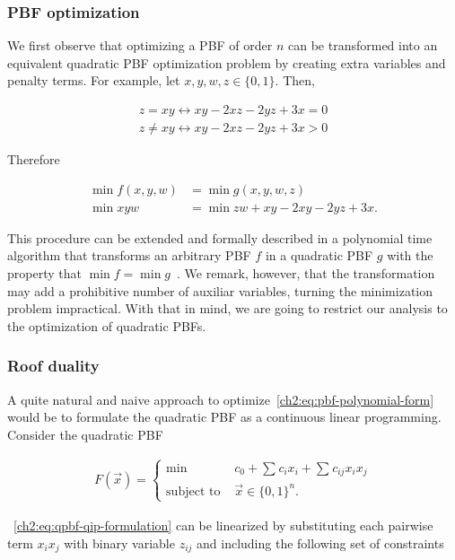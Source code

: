 \subsubsection{PBF optimization}
 We first observe that optimizing a PBF of order $n$ can be transformed into an equivalent quadratic PBF optimization problem by creating extra variables and penalty terms. For example, let $x,y,w,z \in \{0,1\}$. Then,
 
 \begin{align*}
 	z=xy \leftrightarrow  xy -2xz-2yz+3x=0 \\
 	z \neq xy \leftrightarrow  xy -2xz-2yz+3x>0
 \end{align*}
 
 Therefore
 
\begin{align*}
	\min f(x,y,w) &= \min g(x,y,w,z) \\
    \min xyw &= \min zw + xy -2xy -2yz +3x .
\end{align*} 

  This procedure can be extended and formally described in a polynomial time algorithm that transforms an arbitrary PBF $f$ in a quadratic PBF $g$ with the property that $\min f = \min g$~\cite{boros02pseudo}. We remark, however, that the transformation may add a prohibitive number of auxiliar variables, turning the minimization problem impractical. With that in mind, we are going to restrict our analysis to the optimization of quadratic PBFs.
  
\subsubsection{Roof duality}

A quite natural and naive approach to optimize~\cref{ch2:eq:pbf-polynomial-form} would be to formulate the quadratic PBF as a continuous linear programming. Consider the quadratic PBF

\begin{align}
	F(\vec{x}) = \left\{ \begin{array}{rl}
		\min &c_0 + \sum_{}{c_ix_i} + \sum_{}{c_{ij}x_ix_j} \\
	\text{subject to }& \vec{x} \in \{0,1\}^n.
	\end{array}\right.
	\label{ch2:eq:qpbf-qip-formulation}
\end{align}

~\cref{ch2:eq:qpbf-qip-formulation} can be linearized by substituting each pairwise term $x_ix_j$ with binary variable $z_{ij}$ and including the following set of constraints 

